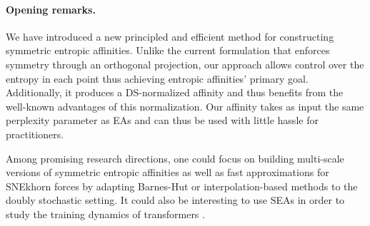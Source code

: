 \paragraph{Opening remarks.}
We have introduced a new principled and efficient method for constructing symmetric entropic affinities. Unlike the current formulation that enforces symmetry through an orthogonal projection, our approach allows control over the entropy in each point thus achieving entropic affinities' primary goal. Additionally, it produces a DS-normalized affinity and thus benefits from the well-known advantages of this normalization. Our affinity takes as input the same perplexity parameter as EAs and can thus be used with little hassle for practitioners.

Among promising research directions, one could focus on building multi-scale versions of symmetric entropic affinities \citep{lee2015multi} as well as fast approximations for SNEkhorn forces by adapting \eg Barnes-Hut \citep{van2013barnes} or interpolation-based methods \citep{linderman2019fast} to the doubly stochastic setting. It could also be interesting to use SEAs in order to study the training dynamics of transformers \citep{zhai2023sigmareparam}.